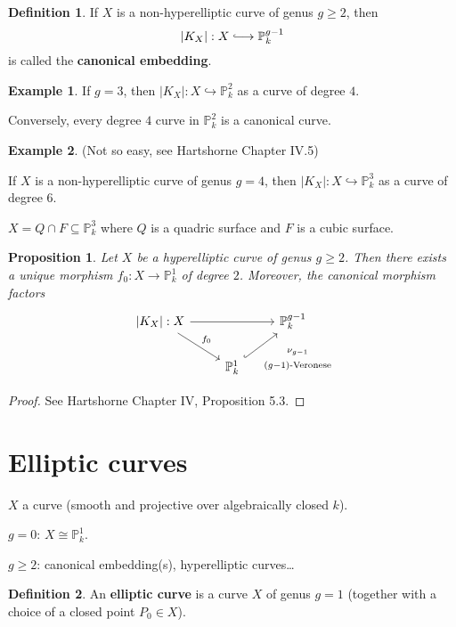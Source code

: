 \documentclass[12pt]{article}
\newtheorem*{proposition}{Proposition}
\theoremstyle{definition}
\newtheorem*{definition}{Definition}
\newtheorem*{example}{Example}
\theoremstyle{remark}
\begin{document}
\begin{definition}
If $X$ is a non-hyperelliptic curve of genus $g\geq2$, then
\[|K_X|:X\lhook\joinrel\longrightarrow\mathbb{P}_k^{g-1}\]
is called the \textbf{canonical embedding}.
\end{definition}

\begin{example}
If $g=3$, then $|K_X|:X\hookrightarrow\mathbb{P}_k^2$ as a curve of degree $4$.

Conversely, every degree $4$ curve in $\mathbb{P}_k^2$ is a canonical curve.
\end{example}

\begin{example}
(Not so easy, see Hartshorne \cite{hartshorne2013algebraic} Chapter IV.5)

If $X$ is a non-hyperelliptic curve of genus $g=4$, then $|K_X|:X\hookrightarrow\mathbb{P}_k^3$ as a curve of degree $6$.

$X=Q\cap F\subseteq\mathbb{P}_k^3$ where $Q$ is a quadric surface and $F$ is a cubic surface.
\end{example}

\begin{proposition}
Let $X$ be a hyperelliptic curve of genus $g\geq2$. Then there exists a unique morphism $f_0:X\rightarrow\mathbb{P}_k^1$ of degree $2$. Moreover, the canonical morphism factors
\[
\begin{tikzcd}
{|K_X|:X}\arrow[rr]\arrow[rd,"f_0"]&&\mathbb{P}_k^{g-1}\\
&\mathbb{P}_k^1\arrow[ru,hook,"\substack{\nu_{g-1}\\\\(g-1)\text{-Veronese}}",swap]
\end{tikzcd}
\]
\end{proposition}

\begin{proof}
See Hartshorne \cite{hartshorne2013algebraic} Chapter IV, Proposition 5.3.
\end{proof}

\section{Elliptic curves}
$X$ a curve (smooth and projective over algebraically closed $k$).

$g=0$: $X\cong\mathbb{P}_k^1$.

$g\geq2$: canonical embedding(s), hyperelliptic curves\ldots

\begin{definition}
An \textbf{elliptic curve} is a curve $X$ of genus $g=1$ (together with a choice of a closed point $P_0\in X$).
\end{definition}
\end{document}
